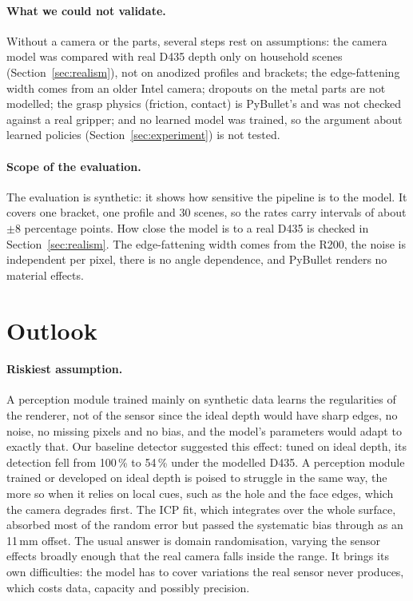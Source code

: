 \documentclass[10pt,a4paper]{article}
\begin{document}
\paragraph{What we could not validate.} Without a camera or the parts, several steps rest on assumptions:
the camera model was compared with real D435 depth only on household scenes (Section~\ref{sec:realism}), not
on anodized profiles and brackets; the edge-fattening width comes from an older Intel camera; dropouts on the
metal parts are not modelled; the grasp physics (friction, contact) is PyBullet's and was not checked against
a real gripper; and no learned model was trained, so the argument about learned policies (Section~\ref{sec:experiment}) is not tested.

\paragraph{Scope of the evaluation.} The evaluation is synthetic: it shows how sensitive the pipeline is to the model. It covers one
bracket, one profile and 30 scenes, so the rates carry intervals of about $\pm 8$ percentage points.
How close the model is to a real D435 is checked in Section~\ref{sec:realism}. The edge-fattening width comes
from the R200, the noise is independent per pixel, there is no angle dependence, and PyBullet renders no
material effects.

\section{Outlook}
\paragraph{Riskiest assumption.} 
A perception module trained mainly on synthetic data learns the
regularities of the renderer, not of the sensor since the ideal depth would have sharp edges, no noise, no missing pixels and no
bias, and the model's parameters would adapt to exactly that. Our baseline detector suggested this effect: 
tuned on ideal depth, its detection fell from 100\,\% to 54\,\% under the modelled D435. A perception module trained or developed on ideal
depth is poised to struggle in the same way, the more so when it relies on local cues, such as the
hole and the face edges, which the camera degrades first. The ICP fit, which integrates over the whole surface,
absorbed most of the random error but passed the systematic bias through as an 11\,mm offset. The usual answer
is domain randomisation, varying the sensor effects broadly enough that the real camera falls inside the range.
It brings its own difficulties: the model has to cover variations the real sensor never produces, which costs
data, capacity and possibly precision. 
\end{document}
